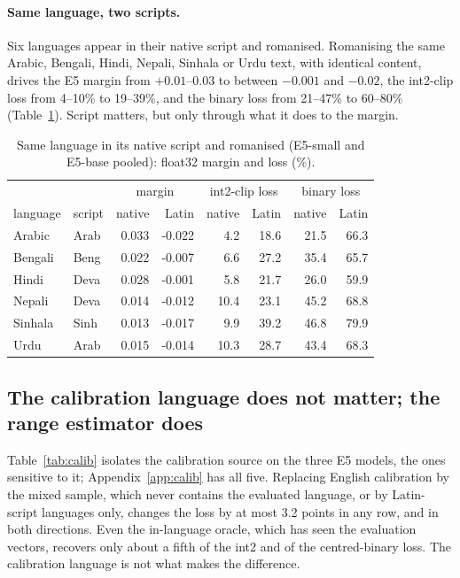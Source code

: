 \documentclass[10pt]{article}
\begin{document}
\paragraph{Same language, two scripts.} Six languages appear in their native script and romanised. Romanising the same Arabic, Bengali, Hindi, Nepali, Sinhala or Urdu text, with identical content, drives the E5 margin from $+0.01$--$0.03$ to between $-0.001$ and $-0.02$, the int2-clip loss from 4--10\% to 19--39\%, and the binary loss from 21--47\% to 60--80\% (Table~\ref{tab:script}). Script matters, but only through what it does to the margin.
\begin{table}[t]\centering\small
\begin{tabular}{llrrrrrr}\toprule
 & & \multicolumn{2}{c}{margin} & \multicolumn{2}{c}{int2-clip loss} & \multicolumn{2}{c}{binary loss} \\
language & script & native & Latin & native & Latin & native & Latin \\ \midrule
Arabic & Arab & 0.033 & -0.022 & 4.2 & 18.6 & 21.5 & 66.3 \\
Bengali & Beng & 0.022 & -0.007 & 6.6 & 27.2 & 35.4 & 65.7 \\
Hindi & Deva & 0.028 & -0.001 & 5.8 & 21.7 & 26.0 & 59.9 \\
Nepali & Deva & 0.014 & -0.012 & 10.4 & 23.1 & 45.2 & 68.8 \\
Sinhala & Sinh & 0.013 & -0.017 & 9.9 & 39.2 & 46.8 & 79.9 \\
Urdu & Arab & 0.015 & -0.014 & 10.3 & 28.7 & 43.4 & 68.3 \\ \bottomrule
\end{tabular}
\caption{Same language in its native script and romanised (E5-small and E5-base pooled): float32 margin and loss (\%).}\label{tab:script}
\end{table}

\subsection{The calibration language does not matter; the range estimator does}\label{sec:calib}

Table~\ref{tab:calib} isolates the calibration source on the three E5 models, the ones sensitive to it; Appendix~\ref{app:calib} has all five. Replacing English calibration by the mixed sample, which never contains the evaluated language, or by Latin-script languages only, changes the loss by at most 3.2 points in any row, and in both directions. Even the in-language oracle, which has seen the evaluation vectors, recovers only about a fifth of the int2 and of the centred-binary loss. The calibration language is not what makes the difference.
\end{document}
